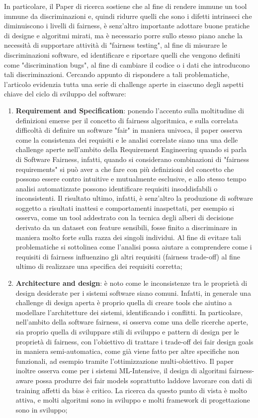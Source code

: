 \cite{brun2018software} In particolare, il Paper di ricerca sostiene che al fine di rendere immune un tool immune da discriminazioni e, quindi ridurre quelli che sono i difetti intrinseci che diminuiscono i livelli di fairness, è senz'altro importante adottare buone pratiche di designe e algoritmi mirati, ma è necessario porre sullo stesso piano anche la necessità di supportare attività di "fairness testing", al fine di misurare le discriminazioni software, ed identificare e riportare quelli che vengono definiti come "discrimination bugs", al fine di cambiare il codice o i dati che introducono tali discriminazioni. Cercando appunto di rispondere a tali problematiche, l'articolo evidenzia tutta una serie di challenge aperte in ciascuno degli aspetti chiave del ciclo di sviluppo del software:

\begin{enumerate}
    \item \textbf{Requirement and Specification}: ponendo l'accento sulla moltitudine di definizioni emerse per il concetto di fairness algoritmica, e sulla correlata difficoltà di definire un software "fair" in maniera univoca, il paper osserva come la consistenza dei requisiti e le analisi correlate siano una una delle challenge aperte nell'ambito della Requirement Engineering quando si parla di Software Fairness, infatti, quando si considerano combinazioni di "fairness requirements" si può aver a che fare con più definizioni del concetto che possono essere contro intuitive e mutualmente esclusive, e allo stesso tempo analisi automatizzate possono identificare requisiti insoddisfabili o inconsistenti. Il risultato ultimo, infatti, è senz'altro la produzione di software soggetto a risultati inattesi e comportamenti inaspettati, per esempio si osserva, come un tool addestrato con la tecnica degli alberi di decisione derivato da un dataset con feature sensibili, fosse finito a discriminare in maniera molto forte sulla razza dei singoli individui. Al fine di evitare tali problematiche si sottolinea come l'analisi possa aiutare a comprendere come i requisiti di fairness influenzino gli altri requisiti (fairness trade-off) al fine ultimo di realizzare una specifica dei requisiti corretta;
    \item \textbf{Architecture and design}: è noto come le inconsistenze tra le proprietà di design desiderate per i sistemi software siano comuni. Infatti, in generale una challenge di design aperta è proprio quella di creare tools che aiutino a modellare l'architetture dei sistemi, identificando i conflitti. In particolare, nell'ambito della software fairness, si osserva come una delle ricerche aperte, sia proprio quella di sviluppare stili di sviluppo e pattern di design per le proprietà di fairness, con l'obiettivo di trattare i trade-off dei fair design goals  in maniera semi-automatica, come già viene fatto per altre specifiche non funzionali, ad esempio tramite l'ottimizzazione multi-obiettivo. Il paper inoltre osserva come  per i sistemi ML-Intensive, il design di algoritmi fairness-aware possa produrre dei fair models soprattutto laddove lavorare con dati di training affetti da bias è critico. La ricerca da questo punto di vista è molto attiva, e molti algoritmi sono in sviluppo e molti framework di progettazione sono in sviluppo;

\end{enumerate}
